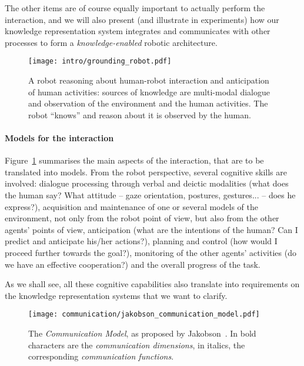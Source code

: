 The other items are of course equally important to actually perform the
interaction, and we will also present (and illustrate in experiments) how our
knowledge representation system integrates and communicates with other
processes to form a \emph{knowledge-enabled} robotic architecture.


\begin{figure}
    \centering
    \texttt{[image: intro/grounding\_robot.pdf]}
    
    \caption{A robot reasoning about human-robot interaction and anticipation
    of human activities: sources of knowledge are multi-modal dialogue and
    observation of the environment and the human activities. The robot ``knows''
    and reason about it is observed by the human.}

    \label{fig|hri-dec}
\end{figure}


\paragraph{Models for the interaction} Figure~\ref{fig|hri-dec} summarises the
main aspects of the interaction, that are to be translated into models.  From
the robot perspective, several cognitive skills are involved: dialogue
processing through verbal and deictic modalities (what does the human say? What
attitude -- gaze orientation, postures, gestures... -- does he express?), acquisition
and maintenance of one or several models of the environment, not only from the
robot point of view, but also from the other agents' points of view,
anticipation (what are the intentions of the human? Can I predict and
anticipate his/her actions?), planning and control (how would I proceed further
towards the goal?), monitoring of the other agents' activities (do we have an
effective cooperation?) and the overall progress of the task. 

As we shall see, all these cognitive capabilities also translate into
requirements on the knowledge representation systems that we want to clarify.

\begin{figure}%
\centering
  \texttt{[image: communication/jakobson\_communication\_model.pdf]}

  \caption{The \emph{Communication Model}, as proposed by
  Jakobson~\cite{Jakobson1960}. In bold characters are the \emph{communication
  dimensions}, in italics, the corresponding \emph{communication functions}.}
  
  \label{fig|jakobson_communication_model}
\end{figure}


